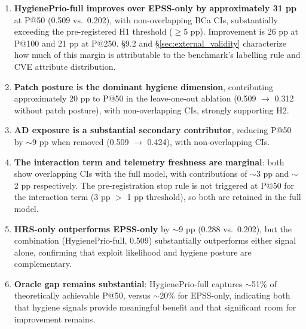 \begin{enumerate}
 \item \textbf{HygienePrio-full improves over EPSS-only by approximately 31 pp} at P@50 (0.509 vs.\ 0.202), with non-overlapping BCa CIs, substantially exceeding the pre-registered H1 threshold ($\geq$5 pp). Improvement is 26 pp at P@100 and 21 pp at P@250. \S9.2 and \S\ref{sec:external_validity} characterize how much of this margin is attributable to the benchmark's labelling rule and CVE attribute distribution.
 \item \textbf{Patch posture is the dominant hygiene dimension}, contributing approximately 20 pp to P@50 in the leave-one-out ablation (0.509 $\to$ 0.312 without patch posture), with non-overlapping CIs, strongly supporting H2.
 \item \textbf{AD exposure is a substantial secondary contributor}, reducing P@50 by $\sim$9 pp when removed (0.509 $\to$ 0.424), with non-overlapping CIs.
 \item \textbf{The interaction term and telemetry freshness are marginal}: both show overlapping CIs with the full model, with contributions of $\sim$3 pp and $\sim$2 pp respectively. The pre-registration stop rule is not triggered at P@50 for the interaction term (3 pp $>$ 1 pp threshold), so both are retained in the full model.
 \item \textbf{HRS-only outperforms EPSS-only} by $\sim$9 pp (0.288 vs.\ 0.202), but the combination (HygienePrio-full, 0.509) substantially outperforms either signal alone, confirming that exploit likelihood and hygiene posture are complementary.
 \item \textbf{Oracle gap remains substantial}: HygienePrio-full captures $\sim$51\% of theoretically achievable P@50, versus $\sim$20\% for EPSS-only, indicating both that hygiene signals provide meaningful benefit and that significant room for improvement remains.
\end{enumerate}
